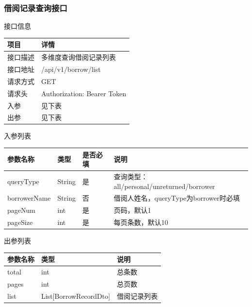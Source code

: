 \documentclass[12pt, a4paper]{article}
\begin{document}
\subsubsection{借阅记录查询接口}

\begin{center}
    接口信息
\end{center}

\begin{table}[H]
    \centering
    \begin{tabular}{|l|l|}
        \hline
        项目 & 详情 \\
        \hline
        接口描述 & 多维度查询借阅记录列表 \\
        \hline
        接口地址 & /api/v1/borrow/list \\
        \hline
        请求方式 & GET \\
        \hline
        请求头 & Authorization: Bearer {Token} \\
        \hline
        入参 & 见下表 \\
        \hline
        出参 & 见下表 \\
        \hline
    \end{tabular}
\end{table}

入参列表

\begin{table}[H]
    \centering
    \begin{tabular}{|l|l|l|l|}
        \hline
        参数名称 & 类型 & 是否必填 & 说明 \\
        \hline
        queryType & String & 是 & 查询类型：all/personal/unreturned/borrower \\
        \hline
        borrowerName & String & 否 & 借阅人姓名，queryType为borrower时必填 \\
        \hline
        pageNum & int & 是 & 页码，默认1 \\
        \hline
        pageSize & int & 是 & 每页条数，默认10 \\
        \hline
    \end{tabular}
\end{table}

出参列表

\begin{table}[H]
    \centering
    \begin{tabular}{|l|l|l|}
        \hline
        参数名称 & 类型 & 说明 \\
        \hline
        total & int & 总条数 \\
        \hline
        pages & int & 总页数 \\
        \hline
        list & List[BorrowRecordDto] & 借阅记录列表 \\
        \hline
    \end{tabular}
\end{table}
\end{document}
